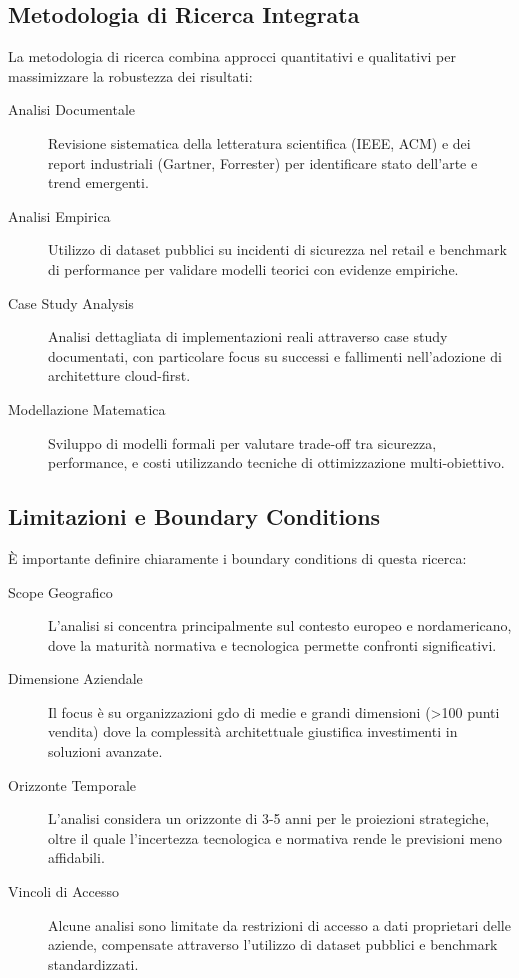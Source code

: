 \subsection{Metodologia di Ricerca Integrata}
\label{subsec:metodologia-integrata}

La metodologia di ricerca combina approcci quantitativi e qualitativi per massimizzare la robustezza dei risultati:

\begin{description}
    \item[Analisi Documentale] Revisione sistematica della letteratura scientifica (IEEE, ACM) e dei report industriali (Gartner, Forrester) per identificare stato dell'arte e trend emergenti.
    
    \item[Analisi Empirica] Utilizzo di dataset pubblici su incidenti di sicurezza nel retail e benchmark di performance per validare modelli teorici con evidenze empiriche.
    
    \item[Case Study Analysis] Analisi dettagliata di implementazioni reali attraverso case study documentati, con particolare focus su successi e fallimenti nell'adozione di architetture cloud-first.
    
    \item[Modellazione Matematica] Sviluppo di modelli formali per valutare trade-off tra sicurezza, performance, e costi utilizzando tecniche di ottimizzazione multi-obiettivo.
\end{description}

\subsection{Limitazioni e Boundary Conditions}
\label{subsec:limitazioni}

È importante definire chiaramente i boundary conditions di questa ricerca:

\begin{description}
    \item[Scope Geografico] L'analisi si concentra principalmente sul contesto europeo e nordamericano, dove la maturità normativa e tecnologica permette confronti significativi.
    
    \item[Dimensione Aziendale] Il focus è su organizzazioni \gls{gdo} di medie e grandi dimensioni (>100 punti vendita) dove la complessità architettuale giustifica investimenti in soluzioni avanzate.
    
    \item[Orizzonte Temporale] L'analisi considera un orizzonte di 3-5 anni per le proiezioni strategiche, oltre il quale l'incertezza tecnologica e normativa rende le previsioni meno affidabili.
    
    \item[Vincoli di Accesso] Alcune analisi sono limitate da restrizioni di accesso a dati proprietari delle aziende, compensate attraverso l'utilizzo di dataset pubblici e benchmark standardizzati.
\end{description}

